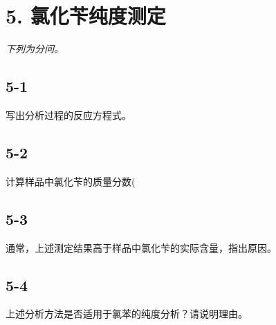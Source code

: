 \section*{5. 氯化苄纯度测定}
\textit{下列为分问。}

\subsection*{5-1}
写出分析过程的反应⽅程式。

\subsection*{5-2}
计算样品中氯化苄的质量分数(%

\subsection*{5-3}
通常，上述测定结果⾼于样品中氯化苄的实际含量，指出原因。

\subsection*{5-4}
上述分析⽅法是否适⽤于氯苯的纯度分析？请说明理由。
